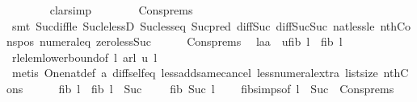 \begin{isabellebody}
\ \ \ \ \ \ \isamarkupfalse%
\ clarsimp\isanewline
\ \ \ \ \ \ \isamarkupfalse%
\ Cons{\isachardot}prems\ \isamarkupfalse%
\ {\isacharparenleft}smt\ Suc{\isacharunderscore}diff{\isacharunderscore}le\ Suc{\isacharunderscore}le{\isacharunderscore}lessD\ Suc{\isacharunderscore}less{\isacharunderscore}eq\ Suc{\isacharunderscore}pred\ diff{\isacharunderscore}Suc{\isacharunderscore}{}\ diff{\isacharunderscore}Suc{\isacharunderscore}Suc\ nat{\isacharunderscore}less{\isacharunderscore}le\ nth{\isacharunderscore}Cons{\isacharunderscore}pos\ numeral{\isacharunderscore}{}{\isacharunderscore}eq{\isacharunderscore}{}\ zero{\isacharunderscore}less{\isacharunderscore}Suc{\isacharparenright}\isanewline
\ \ \ \ \isamarkupfalse%
\ Cons{\isachardot}prems\ \isamarkupfalse%
\ la{\isacharcolon}{\isachardoublequoteopen}a\ {\isasymge}\ u{\isacharasterisk}{\isacharparenleft}fib\ {\isacharparenleft}l{\isacharminus}{}{\isacharparenright}{\isacharparenright}\ {\isacharplus}\ {\isacharparenleft}fib{}\ {\isacharparenleft}l{\isacharminus}{}{\isacharparenright}{\isacharparenright}{\isachardoublequoteclose}\ \isamarkupfalse%
\ rl{\isacharunderscore}elem{\isacharunderscore}lower{\isacharunderscore}bound{\isacharbrackleft}of\ l\ {\isachardoublequoteopen}a{\isacharhash}rl{\isachardoublequoteclose}\ u\ {\isachardoublequoteopen}l{\isacharminus}{}{\isachardoublequoteclose}{\isacharbrackright}\isanewline
\ \ \ \ \ \ \isamarkupfalse%
\ {\isacharparenleft}metis\ One{\isacharunderscore}nat{\isacharunderscore}def\ a{}\ diff{\isacharunderscore}self{\isacharunderscore}eq{\isacharunderscore}{}\ less{\isacharunderscore}add{\isacharunderscore}same{\isacharunderscore}cancel{}\ less{\isacharunderscore}numeral{\isacharunderscore}extra{\isacharparenleft}{}{\isacharparenright}\ list{\isachardot}size{\isacharparenleft}{}{\isacharparenright}\ nth{\isacharunderscore}Cons{\isacharunderscore}{}{\isacharparenright}\isanewline
\ \ \ \ \isamarkupfalse%
\ {\isachardoublequoteopen}fib{}\ l\ {\isacharplus}\ fib{}\ {\isacharparenleft}l\ {\isacharminus}\ Suc\ {}{\isacharparenright}\ {\isacharplus}\ {}\ {\isacharequal}\ fib{}\ {\isacharparenleft}Suc\ l{\isacharparenright}\ {\isachardoublequoteclose}\ \ \isamarkupfalse%
\ fib{}{\isachardot}simps{\isacharparenleft}{}{\isacharparenright}{\isacharbrackleft}of\ {\isachardoublequoteopen}l\ {\isacharminus}\ Suc\ {}{\isachardoublequoteclose}{\isacharbrackright}\ Cons{\isachardot}prems{\isacharparenleft}{}{\isacharparenright}\ \isamarkupfalse%

\end{isabellebody}
